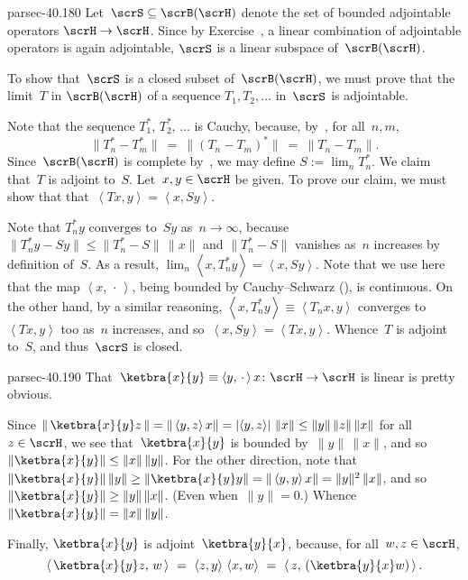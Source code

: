 \documentclass[b5page]{book}
\begin{document}
\begin{solution}{parsec-40.180}%
Let~$\scrS \subseteq \scrB(\scrH)$
denote the set of bounded adjointable operators $\scrH\to\scrH$.
Since by Exercise~,
a linear combination
of adjointable operators is again adjointable,
$\scrS$ is a linear subspace of~$\scrB(\scrH)$.

To show that~$\scrS$ is a closed subset of~$\scrB(\scrH)$,
we must prove that 
the limit~$T$ in $\scrB(\scrH)$
of
a
sequence  $T_1,T_2,\dotsc$
in~$\scrS$
is adjointable.

Note that the sequence $T_1^*,\,T_2^*,\,\dotsc$
is Cauchy, because,
by~, for all~$n,m$,
    \begin{equation*}
    \|T_n^*-T_m^*\|\ =\ \|(T_n-T_m)^*\|\ =\ \|T_n-T_m\|.
    \end{equation*}
Since~$\scrB(\scrH)$ is complete
by~,
we may define $S:=\lim_n T_n^*$.
We claim that~$T$ is adjoint to~$S$.
Let~$x,y\in \scrH$ be given.
To prove our claim,
we must show that
that~$\left<Tx,y\right> = \left<x,Sy\right>$.

Note that $T_n^*y$ converges to~$Sy$ as~$n\to\infty$,
because~$\|T_n^*y-Sy\|\leq \|T_n^*-S\|\,\|x\|$
and $\|T_n^*-S\|$ vanishes as~$n$ increases
    by definition of~$S$.
As a result,
$\lim_n \left<x,T_n^*y\right> = \left<x,Sy\right>$.
Note that we use here
that the map $\left<x,\,\cdot\,\right>$,
being bounded by Cauchy--Schwarz
(),
is continuous.
On the other hand,
by a similar reasoning,
$\left<x,T_n^*y\right>
\equiv \left<T_nx,y\right>$
converges to~$\left<Tx,y\right>$ too
as~$n$ increases,
and so~$\left<x,Sy\right>=\left<Tx,y\right>$.
Whence~$T$ is adjoint to~$S$,
and thus~$\scrS$ is closed.
\end{solution}
\begin{solution}{parsec-40.190}%
That~$\ketbra{x}{y}\equiv \left<y,\,\cdot\,\right>x\colon \scrH\to\scrH$ 
is linear is pretty obvious.
    
    Since $\|\,\ketbra{x}{y}z\,\|
    = \|\left<y,z\right>x\|
    =\left|\left<y,z\right>\right|\,\|x\|
    \leq \|y\|\,\|z\|\,\|x\|$
    for all~$z\in\scrH$,
    we see that~$\ketbra{x}{y}$
    is bounded by~$\|y\|\,\|x\|$,
    and so~$\|\ketbra{x}{y}\|\leq \|x\|\,\|y\|$.
    For the other direction,
    note that $\|\ketbra{x}{y}\| \,\|y\|\geq 
    \|\ketbra{x}{y}y\|=\|\left<y,y\right>x\|
    = \|y\|^2\,\|x\|$,
    and so~$\|\ketbra{x}{y}\|\geq \|y\|\,\|x\|$.
    (Even when~$\|y\|=0$.)
    Whence $\|\ketbra{x}{y}\|=\|x\|\,\|y\|$.

Finally,  $\ketbra{x}{y}$
    is adjoint~$\ketbra{y}{x}$,
    because, for all~$w,z\in\scrH$,
    \begin{equation*}
        \left<\,\ketbra{x}{y}z,\, w\,\right>
        \ = \ 
        \left<z,y\right>\,\left<x,w\right>
        \ = \ 
        \left<\, z,\,(\ketbra{y}{x}w)\,\right>.
    \end{equation*}
\end{solution}
\end{document}
